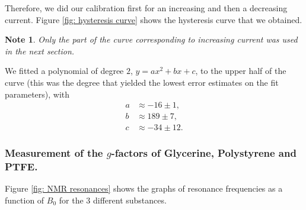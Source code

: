 \documentclass[a4paper]{jpconf}
\numberwithin{equation}{section}
\newtheorem*{note}{Note}
\begin{document}
Therefore, we did our calibration first for an increasing and then a decreasing current. Figure \ref{fig: hysteresis curve} shows the hysteresis curve that we obtained.
\begin{note}
	Only the part of the curve corresponding to increasing current was used in the next section.
\end{note}
We fitted a polynomial of degree $2$, $y = ax^2 + bx + c$, to the upper half of the curve (this was the degree that yielded the lowest error estimates on the fit parameters), with
\begin{align*}
	a &\approx -16 \pm 1, \\
	b &\approx 189 \pm 7, \\
	c &\approx -34 \pm 12.
\end{align*}


\subsubsection{Measurement of the $g$-factors of Glycerine, Polystyrene and PTFE.}

Figure \ref{fig: NMR resonances} shows the graphs of resonance frequencies as a function of $B_0$ for the 3 different substances.%
\end{document}
